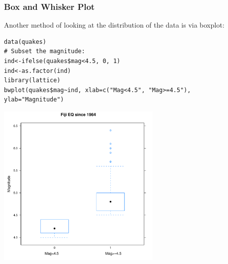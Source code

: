 \begin{frame}
\frametitle{Box and Whisker Plot}

Another method of looking at the distribution of the data is via boxplot:
  		\begin{lstlisting}
data(quakes)		
# Subset the magnitude:
ind<-ifelse(quakes$mag<4.5, 0, 1)
ind<-as.factor(ind)
library(lattice)
bwplot(quakes$mag~ind, xlab=c("Mag<4.5", "Mag>=4.5"), ylab="Magnitude")
		\end{lstlisting}

        \begin{center}
         \includegraphics[width=0.6\textwidth]{images/bwplot.pdf}
        \end{center}
\end{frame}

